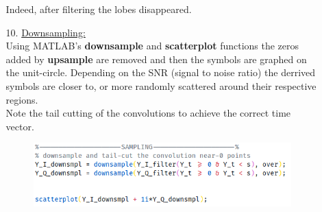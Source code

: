 \documentclass[12pt, a4paper]{article}
\begin{document}
\begin{enumerate}
\begin{enumerate}
        Indeed, after filtering the lobes disappeared.
        \item[10.] \underline{Downsampling:}\\
        Using MATLAB's \textbf{downsample} and \textbf{scatterplot} functions the zeros added by \textbf{upsample} are removed and then the symbols 
        are graphed on the unit-circle. 
        Depending on the SNR (signal to noise ratio) the derrived symbols are closer to, or more randomly scattered around their respective regions.\\
        Note the tail cutting of the convolutions to achieve the correct time vector.
        \begin{figure}[H]
            \centering
            \includegraphics[scale=0.9]{down.png}
        \end{figure}
        \begin{figure}[H]
            \centering
            \quad

\end{figure}
\end{enumerate}
\end{enumerate}
\end{document}
